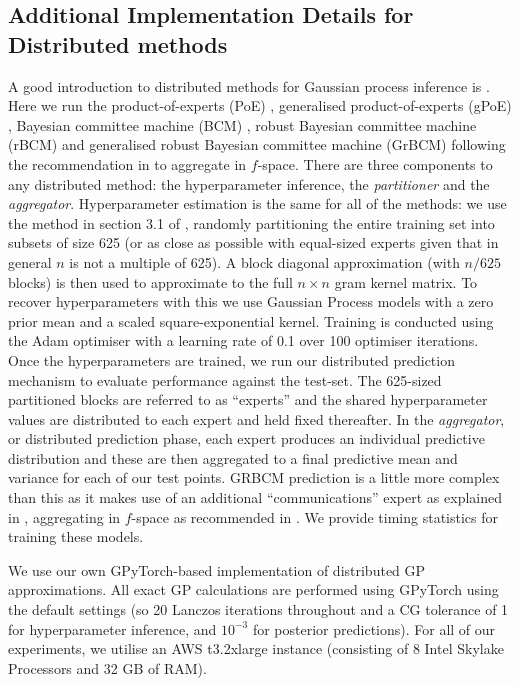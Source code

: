 \subsection{Additional Implementation Details for Distributed methods}
 A good introduction to distributed methods for Gaussian process inference is \cite{deisenroth2015distributed}. Here we run the product-of-experts (PoE) \cite{hinton2002training}, generalised product-of-experts (gPoE) \cite{cao2014generalized}, Bayesian committee machine (BCM) \cite{tresp2000bayesian}, robust Bayesian committee machine (rBCM) \cite{deisenroth2015distributed} and generalised robust Bayesian committee machine (GrBCM) \cite{amalg_SOD} following the recommendation in \cite{Cohen20b} to aggregate in $f$-space.
 There are three components to any distributed method: the hyperparameter inference, the \emph{partitioner} and the \emph{aggregator}.
Hyperparameter estimation is the same for all of the methods: we use the method in section 3.1 of \cite{deisenroth2015distributed}, randomly partitioning the entire training set into subsets of size 625 (or as close as possible with equal-sized experts given that in general $n$ is not a multiple of 625). A block diagonal approximation (with $n/625$ blocks) is then used to approximate to the full $n \times n$ gram kernel matrix. To recover hyperparameters with this we use Gaussian Process models with a zero prior mean and a scaled square-exponential kernel. Training is conducted using the Adam optimiser with a learning rate of 0.1 over 100 optimiser iterations. Once the hyperparameters are trained, we run our distributed prediction mechanism to evaluate performance against the test-set. The 625-sized partitioned blocks are referred to as ``experts'' and the shared hyperparameter values are distributed to each expert and held fixed thereafter. In the \emph{aggregator}, or distributed prediction phase, each expert produces an individual predictive distribution and these are then aggregated to a final predictive mean and variance for each of our test points. GRBCM prediction is a little more complex than this as it makes use of an additional ``communications'' expert as explained in \cite{amalg_SOD}, aggregating in $f$-space as recommended in \cite{Cohen20b}. We provide timing statistics for training these models.

We use our own GPyTorch-based implementation of distributed GP approximations.
All exact GP calculations are performed using GPyTorch using the default settings (so 20 Lanczos iterations throughout and a CG tolerance of 1 for hyperparameter inference, and $10^{-3}$ for posterior predictions).
For all of our experiments, we utilise an AWS t3.2xlarge instance (consisting of 8 Intel Skylake Processors and 32 GB of RAM).




